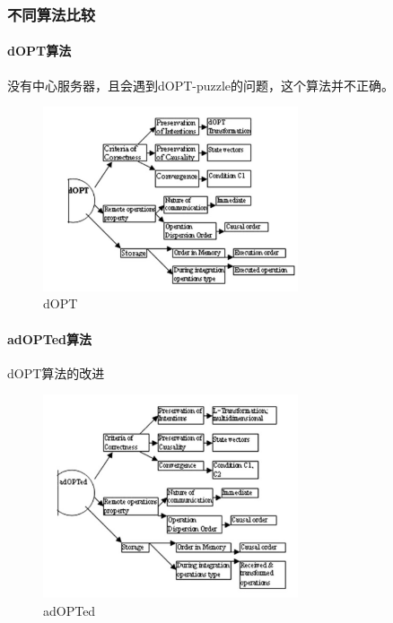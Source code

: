 \documentclass[11pt]{article}
\begin{document}
\subsubsection{不同算法比较}
\paragraph{dOPT算法}
没有中心服务器，且会遇到dOPT-puzzle的问题，这个算法并不正确。
\begin{figure}[H]
    \begin{center}
    \includegraphics[width=0.67\textwidth]{figures/dOPT.png}
    \caption{dOPT}
    \end{center}
\end{figure}
\paragraph{adOPTed算法}
dOPT算法的改进
\begin{figure}[H]
    \begin{center}
    \includegraphics[width=0.67\textwidth]{figures/adOPTed.png}
    \caption{adOPTed}
    \end{center}
\end{figure}
\end{document}

